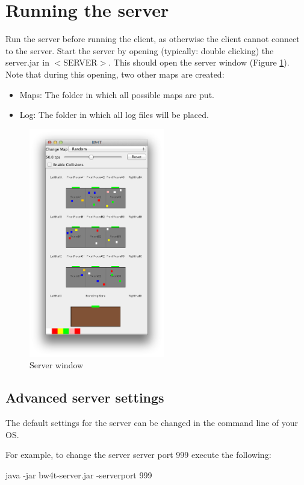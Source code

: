 \documentclass[11pt,a4paper]{article}
\begin{document}
\section{Running the server}
Run the server before running the client, as otherwise the client cannot connect to the server. Start the server by opening (typically: double clicking) the server.jar in $<$SERVER$>$. This should open the server window (Figure  \ref{fig:ServerWindow}). Note that during this opening, two other maps are created: 
\begin{itemize}
\item Maps: The folder in which all possible maps are put.
\item Log: The folder in which all log files will be placed.
\end{itemize}


\begin{figure}[!h]
\begin{center}
   \includegraphics[height=10cm]{server.png}
   \caption{Server window}\label{fig:ServerWindow}
\end{center}
\end{figure}


\subsection{Advanced server settings}
The default settings for the server can be changed in the command line of your OS. 

For example, to change the server server port 999 execute the following:

java -jar bw4t-server.jar -serverport 999
\end{document}
